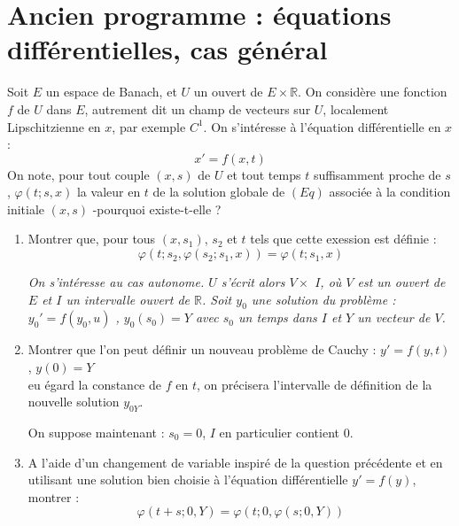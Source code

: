 \section{Ancien programme : \'equations diff\'erentielles, cas g\'en\'eral}

\begin{exer}%
Soit $E$ un espace de Banach, et $U$ un ouvert de $E \times \mathbb{R}$. %
On considère une fonction $f$ de $U$ dans $E$, autrement dit un champ de vecteurs sur $U$, localement Lipschitzienne en $x$, par exemple $C^1$. %
On s'intéresse à l'équation différentielle en $x$ : \[x' = f(x,t)\]
On note, pour tout couple $(x,s)$ de $U$ et tout temps $t$ suffisamment proche de $s$, $\varphi(t;s,x)$ la valeur en $t$ de la solution globale de $(Eq)$ associée à la condition initiale $(x,s)$ -pourquoi existe-t-elle ?\\
\ligneinter
\begin{enumerate}
\item Montrer que, pour tous $(x,s_1)$, $s_2$ et $t$ tels que cette exession est définie : \[\varphi(t;s_2,\varphi(s_2;s_1,x)) = \varphi(t;s_1,x)\]
\begin{center}
\begin{minipage}{16cm}
\textit{
On s'intéresse au cas autonome. %
$U$ s'écrit alors $V \times$ $I$, où $V$ est un ouvert de $E$ et $I$ un intervalle ouvert de $\mathbb{R}$. %
Soit $y_0$ une solution du problème : $y_0' = f(y_0,u)$ , $y_0(s_0) = Y$ avec $s_0$ un temps dans $I$ et $Y$ un vecteur de $V$.
}
\end{minipage}
\end{center}
\item Montrer que l'on peut définir un nouveau problème de Cauchy : $y' = f(y,t)$, $y(0) = Y$\\
eu égard la constance de $f$ en $t$, on précisera l'intervalle de définition de la nouvelle solution $y_{0 Y}$.

\smallskip
On suppose maintenant : $s_0 = 0$, $I$ en particulier contient $0$.
\item A l'aide d'un changement de variable inspiré de la question précédente %
et en utilisant une solution bien choisie à l'équation différentielle $y' = f(y)$, montrer :
\[\varphi(t+s;0,Y) = \varphi(t;0,\varphi(s;0,Y))\]
\end{enumerate}
\end{exer}

